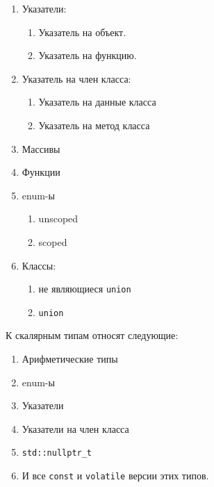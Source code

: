 \begin{enumerate}
\begin{enumerate}
\begin{enumerate}
\begin{enumerate}
\item lvalue ссылка на функцию.
\end{enumerate}

\item rvalue ссылки:
\begin{enumerate}
\item rvalue ссылка на объект.

\item rvalue ссылка на функцию.
\end{enumerate}
\end{enumerate}

\item Указатели:
\begin{enumerate}
\item Указатель на объект.

\item Указатель на функцию.
\end{enumerate}

\item Указатель на член класса:
\begin{enumerate}
\item Указатель на данные класса

\item Указатель на метод класса
\end{enumerate}

\item Массивы

\item Функции

\item enum-ы
\begin{enumerate}
\item unscoped

\item scoped
\end{enumerate}

\item Классы:
\begin{enumerate}
\item не являющиеся \verb"union"

\item \verb"union"
\end{enumerate}
\end{enumerate}
\end{enumerate}

К скалярным типам относят следующие:
\begin{enumerate}
\item Арифметические типы

\item enum-ы

\item Указатели

\item Указатели на член класса

\item \verb"std::nullptr_t"

\item И все \verb"const" и \verb"volatile" версии этих типов.
\end{enumerate}

